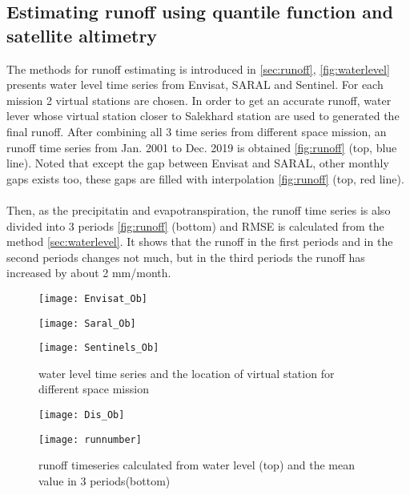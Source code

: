 \subsection{Estimating runoff using quantile function and satellite altimetry}
 The methods for runoff estimating is introduced in \autoref{sec:runoff}, \autoref{fig:waterlevel} presents water level time series from Envisat, SARAL and Sentinel. For each mission 2 virtual stations are chosen. In order to get an accurate runoff, water lever whose virtual station closer to Salekhard station are used to generated the final runoff. After combining all 3 time series from different space mission, an runoff time series from Jan. 2001 to Dec. 2019 is obtained \autoref{fig:runoff} (top, blue line). Noted that except the gap between Envisat and SARAL, other monthly gaps exists too, these gaps are filled with interpolation \autoref{fig:runoff} (top, red line). \\\\
 Then, as the precipitatin and evapotranspiration, the runoff time series is also divided into 3 periods \autoref{fig:runoff} (bottom) and RMSE is calculated from the method \autoref{sec:waterlevel}. It shows that the runoff in the first periods and in the second periods changes not much, but in the third periods the runoff has increased by about 2 mm/month. 
 \begin{figure}[htbp]
 	\centering
 	\begin{minipage}[t]{0.7\textwidth}
 		\centering
 		\texttt{[image: Envisat\_Ob]} %
 	\end{minipage}
 	\begin{minipage}[t]{0.7\textwidth}
 		\centering
 		\texttt{[image: Saral\_Ob]} %
 	\end{minipage}
 \begin{minipage}[t]{0.7\textwidth}
 	\centering
 	\texttt{[image: Sentinels\_Ob]} %
 \end{minipage}
 \caption{water level time series and the location of virtual station for different space mission}
 \label{fig:waterlevel}
 \end{figure}
\begin{figure}[htbp]
	\centering
	\begin{minipage}[t]{0.9\textwidth}
		\centering
		\texttt{[image: Dis\_Ob]} %
	\end{minipage}
	\begin{minipage}[t]{0.9\textwidth}
		\centering
		\texttt{[image: runnumber]} %
	\end{minipage}
	\caption{runoff timeseries calculated from water level (top) and the mean value in 3 periods(bottom) }
	\label{fig:runoff}
\end{figure}
\clearpage
